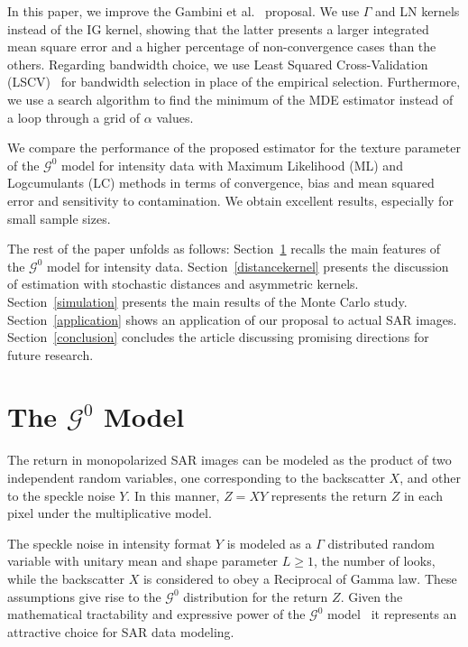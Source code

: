 \documentclass[twocolumn]{svjour3}
\begin{document}
In this paper, we improve the Gambini et al.~\cite{gambini2015} proposal. 
We use $\Gamma$ and LN kernels instead of the IG kernel, showing that the latter presents a larger integrated mean square error and a higher percentage of non-convergence cases than the others.
Regarding bandwidth choice, we use Least Squared Cross-Validation (LSCV)~\cite{Rudemo1982} for bandwidth selection in place of the empirical selection. 
Furthermore, we use a search algorithm to find the minimum of the MDE estimator instead of a loop through a grid of $\alpha$ values. 

We compare the performance of the proposed estimator for the texture parameter of the $\mathcal{G}^0$ model for intensity data with Maximum Likelihood (ML) and Logcumulants (LC) methods in terms of convergence, bias and mean squared error and sensitivity to contamination. 
We obtain excellent results, especially for small sample sizes.

The rest of the paper unfolds as follows: 
Section~\ref{sec_SAR} recalls the main features of the $\mathcal{G}^0$ model for intensity data.
Section~\ref{distancekernel} presents the discussion of estimation with stochastic distances and asymmetric kernels. 
Section~\ref{simulation} presents the main results of the Monte Carlo study. Section~\ref{application} shows an application of our proposal to actual SAR images.
Section~\ref{conclusion} concludes the article discussing promising directions for future research.

\section{The $\mathcal{G}^0$ Model}
\label{sec_SAR}

The return in monopolarized SAR images can be modeled as the product of two independent random variables, one corresponding to the backscatter $X$, and other to the speckle noise $Y$. 
In this manner, $Z=X Y  $ represents the return $Z$ in each pixel under the multiplicative model.

The speckle noise in intensity format $Y$ is modeled as a $\Gamma$ distributed random variable with unitary mean and shape parameter $L\geq1$, the number of looks, while the backscatter $X$ is considered to obey a Reciprocal of Gamma law. 
These assumptions give rise to the $\mathcal{G}^{0}$ distribution for the return $Z$.
Given the mathematical tractability and expressive power of the $\mathcal{G}^{0}$ model~\cite{MejailJacoboFreryBustos:IJRS,mejailfreryjacobobustos2001} it represents an attractive choice for SAR data modeling.
\end{document}
